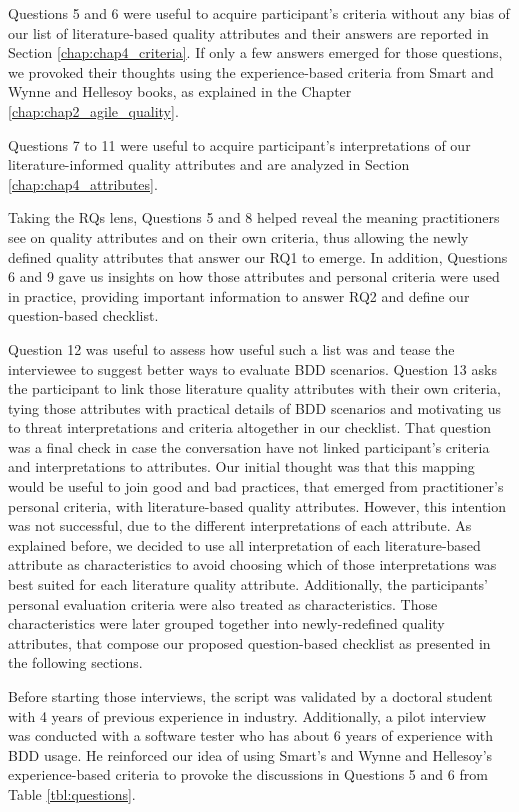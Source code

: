 Questions 5 and 6 were useful to acquire participant's criteria without any bias of our list of literature-based quality attributes and their answers are reported in Section \ref{chap:chap4_criteria}. If only a few answers emerged for those questions, we provoked their thoughts using the experience-based criteria from Smart \cite{Smart_2014} and Wynne and Hellesoy \cite{Wynne_and_Hellesoy_2012} books, as explained in the Chapter \ref{chap:chap2_agile_quality}.

Questions 7 to 11 were useful to acquire participant's interpretations of our literature-informed quality attributes and are analyzed in Section \ref{chap:chap4_attributes}. 

Taking the RQs lens, Questions 5 and 8 helped reveal the meaning practitioners see on quality attributes and on their own criteria, thus allowing the newly defined quality attributes that answer our RQ1 to emerge. In addition, Questions 6 and 9 gave us insights on how those attributes and personal criteria were used in practice, providing important information to answer RQ2 and define our question-based checklist. 

Question 12 was useful to assess how useful such a list was and tease the interviewee to suggest better ways to evaluate BDD scenarios. Question 13 asks the participant to link those literature quality attributes with their own criteria, tying those attributes with practical details of BDD scenarios and motivating us to threat interpretations and criteria altogether in our checklist. That question was a final check in case the conversation have not linked participant's criteria and interpretations to attributes. Our initial thought was that this mapping would be useful to join good and bad practices, that emerged from practitioner's personal criteria, with literature-based quality attributes. However, this intention was not successful, due to the different interpretations of each attribute. As explained before, we decided to use all interpretation of each literature-based attribute as characteristics to avoid choosing which of those interpretations was best suited for each literature quality attribute. Additionally, the participants' personal evaluation criteria were also treated as characteristics. Those characteristics were later grouped together into newly-redefined quality attributes, that compose our proposed question-based checklist as presented in the following sections.

Before starting those interviews, the script was validated by a doctoral student with 4 years of previous experience in industry. Additionally, a pilot interview was conducted with a software tester who has about 6 years of experience with BDD usage. He reinforced our idea of using Smart's \cite{Smart_2014} and Wynne and Hellesoy's \cite{Wynne_and_Hellesoy_2012} experience-based criteria to provoke the discussions in Questions 5 and 6 from Table \ref{tbl:questions}. 

